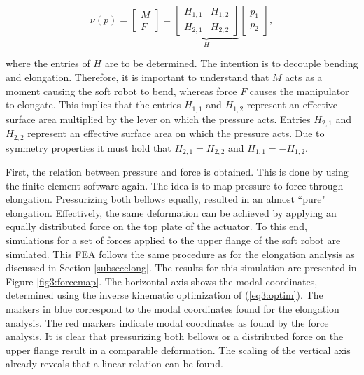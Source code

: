 \begin{equation}
   \nu(p) =   \begin{bmatrix} M \\ F \end{bmatrix}     = \underbrace{\begin{bmatrix}  H_{1,1} & H_{1,2} \\ H_{2,1} & H_{2,2} \end{bmatrix}}_{H}         \begin{bmatrix}  p_1 \\ p_2 \end{bmatrix}, \label{eq3:H}
\end{equation}

where the entries of $H$ are to be determined. The intention is to decouple bending and elongation. Therefore, it is important to understand that $M$ acts as a moment causing the soft robot to bend, whereas force $F$ causes the manipulator to elongate. This implies that the entries $H_{1,1}$ and $H_{1,2}$ represent an effective surface area multiplied by the lever on which the pressure acts. Entries $H_{2,1}$ and $H_{2,2}$ represent an effective surface area on which the pressure acts. Due to symmetry properties it must hold that $H_{2,1} = H_{2,2}$ and $H_{1,1} = -H_{1,2}$.

First, the relation between pressure and force is obtained. This is done by using the finite element software again. The idea is to map pressure to force through elongation. Pressurizing both bellows equally, resulted in an almost ``pure" elongation. Effectively, the same deformation can be achieved by applying an equally distributed force on the top plate of the actuator. To this end, simulations for a set of forces applied to the upper flange of the soft robot are simulated. This FEA follows the same procedure as for the elongation analysis as discussed in Section \ref{subsecelong}. The results for this simulation are presented in Figure \ref{fig3:forcemap}. The horizontal axis shows the modal coordinates, determined using the inverse kinematic optimization of (\ref{eq3:optim}). The markers in blue correspond to the modal coordinates found for the elongation analysis. The red markers indicate modal coordinates as found by the force analysis. It is clear that pressurizing both bellows or a distributed force on the upper flange result in a comparable deformation. The scaling of the vertical axis already reveals that a linear relation can be found.


